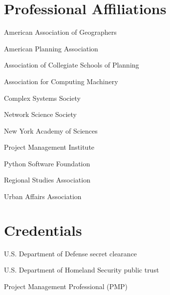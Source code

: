 \documentclass[12pt,letterpaper]{report}
\newcommand{\listitemspace}{0.25em}
\renewenvironment{itemize}
{\begin{list}{}{\setlength{\leftmargin}{0em}
            \setlength{\parskip}{0em}
            \setlength{\itemsep}{\listitemspace}
            \setlength{\parsep}{\listitemspace}}}
{\end{list}}
\begin{document}
    \section*{Professional Affiliations}

    \begin{itemize}

        \item American Association of Geographers

        \item American Planning Association

        \item Association of Collegiate Schools of Planning

        \item Association for Computing Machinery

        \item Complex Systems Society

        \item Network Science Society

        \item New York Academy of Sciences

        \item Project Management Institute

        \item Python Software Foundation

        \item Regional Studies Association

        \item Urban Affairs Association

    \end{itemize}



    \section*{Credentials}

    \begin{itemize}

        \item U.S. Department of Defense secret clearance

        \item U.S. Department of Homeland Security public trust

        \item Project Management Professional (PMP)

    \end{itemize}
\end{document}
